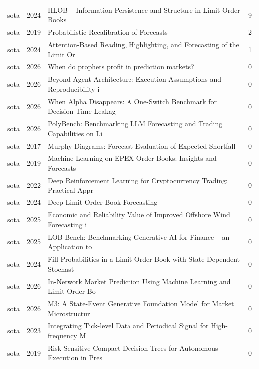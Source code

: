 \begin{longtable}{llp{9.2cm}r}
sota & 2024 & HLOB -- Information Persistence and Structure in Limit Order Books~\citep{briola2024hlob} & 9 \\
sota & 2019 & Probabilistic Recalibration of Forecasts~\citep{graziani2019probabilistic} & 2 \\
sota & 2024 & Attention-Based Reading, Highlighting, and Forecasting of the Limit Or~\citep{jung2024attention} & 1 \\
sota & 2026 & When do prophets profit in prediction markets?~\citep{anri2026when} & 0 \\
sota & 2026 & Beyond Agent Architecture: Execution Assumptions and Reproducibility i~\citep{junyi2026beyond} & 0 \\
sota & 2026 & When Alpha Disappears: A One-Switch Benchmark for Decision-Time Leakag~\citep{fan2026when} & 0 \\
sota & 2026 & PolyBench: Benchmarking LLM Forecasting and Trading Capabilities on Li~\citep{pu2026polybench} & 0 \\
sota & 2017 & Murphy Diagrams: Forecast Evaluation of Expected Shortfall~\citep{f2017murphy} & 0 \\
sota & 2019 & Machine Learning on EPEX Order Books: Insights and Forecasts~\citep{schnurch2019machine} & 0 \\
sota & 2022 & Deep Reinforcement Learning for Cryptocurrency Trading: Practical Appr~\citep{gort2022deep} & 0 \\
sota & 2024 & Deep Limit Order Book Forecasting~\citep{briola2024deep} & 0 \\
sota & 2025 & Economic and Reliability Value of Improved Offshore Wind Forecasting i~\citep{walid2025economic} & 0 \\
sota & 2025 & LOB-Bench: Benchmarking Generative AI for Finance -- an Application to~\citep{nagy2025lob} & 0 \\
sota & 2024 & Fill Probabilities in a Limit Order Book with State-Dependent Stochast~\citep{lokin2024fill} & 0 \\
sota & 2026 & In-Network Market Prediction Using Machine Learning and Limit Order Bo~\citep{xinpeng2026network} & 0 \\
sota & 2026 & M3: A State-Event Generative Foundation Model for Market Microstructur~\citep{yanzhi2026m} & 0 \\
sota & 2023 & Integrating Tick-level Data and Periodical Signal for High-frequency M~\citep{he2023integrating} & 0 \\
sota & 2019 & Risk-Sensitive Compact Decision Trees for Autonomous Execution in Pres~\citep{vyetrenko2019risk} & 0 \\

\end{longtable}
